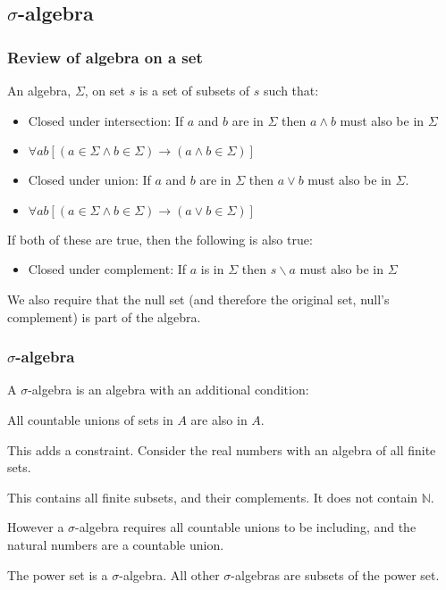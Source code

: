 
\subsection{\(\sigma \)-algebra}

\subsubsection{Review of algebra on a set}

An algebra, \(\Sigma \), on set \(s\) is a set of subsets of \(s\) such that:

\begin{itemize}
\item Closed under intersection: If \(a\) and \(b\) are in \(\Sigma \) then \(a\land b\) must also be in \(\Sigma \)
\item \(\forall ab [(a \in \Sigma \land b \in \Sigma )\rightarrow (a\land b \in \Sigma)]\)
\item Closed under union: If \(a\) and \(b\) are in \(\Sigma \) then \(a\lor b\) must also be in \(\Sigma \).
\item \(\forall ab [(a \in \Sigma \land b \in \Sigma )\rightarrow (a\lor b \in \Sigma)]\)
\end{itemize}

If both of these are true, then the following is also true:

\begin{itemize}
\item Closed under complement: If \(a\) is in \(\Sigma \) then \(s \backslash a\) must also be in \(\Sigma \)	
\end{itemize}

We also require that the null set (and therefore the original set, null's complement) is part of the algebra.

\subsubsection{\(\sigma \)-algebra}

A \(\sigma \)-algebra is an algebra with an additional condition:

All countable unions of sets in \(A\) are also in \(A\).

This adds a constraint. Consider the real numbers with an algebra of all finite sets.

This contains all finite subsets, and their complements. It does not contain \(\mathbb{N}\).

However a \(\sigma \)-algebra requires all countable unions to be including, and the natural numbers are a countable union.

The power set is a \(\sigma \)-algebra. All other \(\sigma \)-algebras are subsets of the power set.

